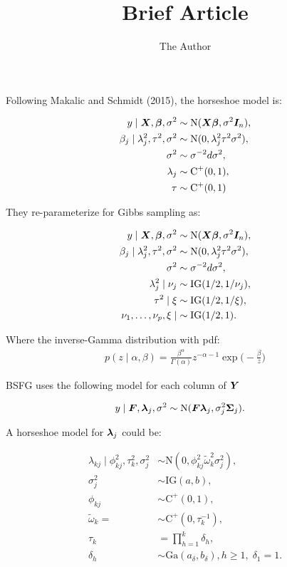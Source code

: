 \documentclass[11pt]{amsart}
\title{Brief Article}
\author{The Author}
\newcommand*{\B}[1]{\ifmmode\bm{#1}\else\textbf{#1}\fi}
\begin{document}
Following Makalic and Schmidt (2015), the horseshoe model is:

\begin{align*}
y \mid \B{X},\B{\beta},\sigma^2 &\sim \mbox{N}(\B{X\beta},\sigma^2\B{I}_n), \\
\beta_j \mid \lambda^2_j, \tau^2, \sigma^2 &\sim \mbox{N}(0,\lambda^2_j \tau^2 \sigma^2), \\
\sigma^2 &\sim \sigma^{-2}d\sigma^2, \\
\lambda_j &\sim \mbox{C}^+(0,1), \\
\tau &\sim \mbox{C}^+(0,1)
\end{align*}

They re-parameterize for Gibbs sampling as:

\begin{align*}
y \mid \B{X},\B{\beta},\sigma^2 &\sim \mbox{N}(\B{X\beta},\sigma^2\B{I}_n), \\
\beta_j \mid \lambda^2_j, \tau^2, \sigma^2 &\sim \mbox{N}(0,\lambda^2_j \tau^2 \sigma^2), \\
\sigma^2 &\sim \sigma^{-2}d\sigma^2, \\
\lambda^2_j \mid \nu_j &\sim \mbox{IG}(1/2,1/\nu_j), \\
\tau^2 \mid \xi &\sim \mbox{IG}(1/2,1/\xi), \\
\nu_1,\dots,\nu_p,\xi \mid &\sim \mbox{IG}(1/2,1).
\end{align*}

Where the inverse-Gamma distribution with pdf:
\begin{align*}
p(z \mid \alpha,\beta) = \frac{\beta^\alpha}{\Gamma(\alpha)} z^{-\alpha-1} \exp\big(-\frac{\beta}{z}\big)
\end{align*}

BSFG uses the following model for each column of $\B{Y}$

\begin{align*}
y \mid \B{F},\B{\lambda}_j,\sigma^2 &\sim \mbox{N}(\B{F}\B{\lambda}_j, \sigma^2_j\B{\Sigma}_j).
\end{align*}

A horseshoe model for $\B{\lambda}_j$ could be:

\begin{align*}
\lambda_{kj} \mid \phi^2_{kj}, \tau^2_k, \sigma^2_j &\sim \mbox{N}(0,\phi^2_{kj}\tilde{\omega}^2_k \sigma^2_j), \\
\sigma^2_j &\sim \mbox{IG}(a,b), \\
\phi_{kj} &\sim \mbox{C}^+(0,1), \\
\tilde{\omega}_k = &\sim \mbox{C}^+(0,\tau^{-1}_k), \\
\tau_k &= \prod\limits_{h=1}^k \delta_h, \\
\delta_h &\sim \mbox{Ga}(a_\delta,b_\delta), h \geq 1, \; \delta_1 = 1.
\end{align*}
\end{document}
